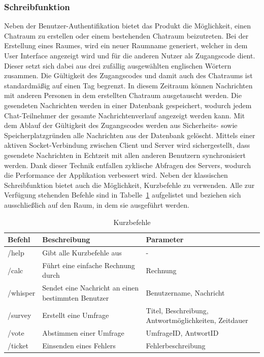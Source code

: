 \subsubsection{Schreibfunktion}
Neben der Benutzer-Authentifikation bietet das Produkt die Möglichkeit, einen Chatraum zu erstellen oder einem bestehenden Chatraum beizutreten.
Bei der Erstellung eines Raumes, wird ein neuer Raumname generiert, welcher in dem User Interface angezeigt wird und für die anderen Nutzer als Zugangscode dient.
Dieser setzt sich dabei aus drei zufällig ausgewählten englischen Wörtern zusammen.
\newparagraph
Die Gültigkeit des Zugangscodes und damit auch des Chatraums ist standardmäßig auf einen Tag begrenzt.
In diesem Zeitraum können Nachrichten mit anderen Personen in dem erstellten Chatraum ausgetauscht werden.
Die gesendeten Nachrichten werden in einer Datenbank gespeichert, wodurch jedem Chat-Teilnehmer der gesamte Nachrichtenverlauf angezeigt werden kann.
Mit dem Ablauf der Gültigkeit des Zugangscodes werden aus Sicherheits- sowie Speicherplatzgründen alle Nachrichten aus der Datenbank gelöscht.
\newparagraph
Mittels einer aktiven Socket-Verbindung zwischen Client und Server wird sichergestellt, dass gesendete Nachrichten in Echtzeit mit allen anderen Benutzern synchronisiert werden.
Dank dieser Technik entfallen zyklische Abfragen des Servers, wodurch die Performance der Applikation verbessert wird.
\newparagraph
Neben der klassischen Schreibfunktion bietet  auch die Möglichkeit, Kurzbefehle zu verwenden.
Alle zur Verfügung stehenden Befehle sind in Tabelle~\ref{tab:Kurzbefehle} aufgelistet und beziehen sich ausschließlich auf den Raum, in dem sie ausgeführt werden.

\begin{table}[H]
  \centering
  \begin{tabular}{|l|m{.5\linewidth}|m{.32\linewidth}|}
    \hline
    \textbf{Befehl} & \textbf{Beschreibung} & \textbf{Parameter} \\
    \hline
    /help     & Gibt alle Kurzbefehle aus                           & - \\
    \hline
    /calc     & Führt eine einfache Rechnung durch                  & Rechnung \\
    \hline
    /whisper  & Sendet eine Nachricht an einen bestimmten Benutzer  & Benutzername, Nachricht \\
    \hline
    /survey   & Erstellt eine Umfrage                               & Titel, Beschreibung, Antwortmöglichkeiten, Zeitdauer \\
    \hline
    /vote     & Abstimmen einer Umfrage                             & UmfrageID, AntwortID \\
    \hline
    /ticket   & Einsenden eines Fehlers                             & Fehlerbeschreibung \\
    \hline
  \end{tabular}
  \caption{Kurzbefehle}
  \label{tab:Kurzbefehle}
\end{table}
\noindent

